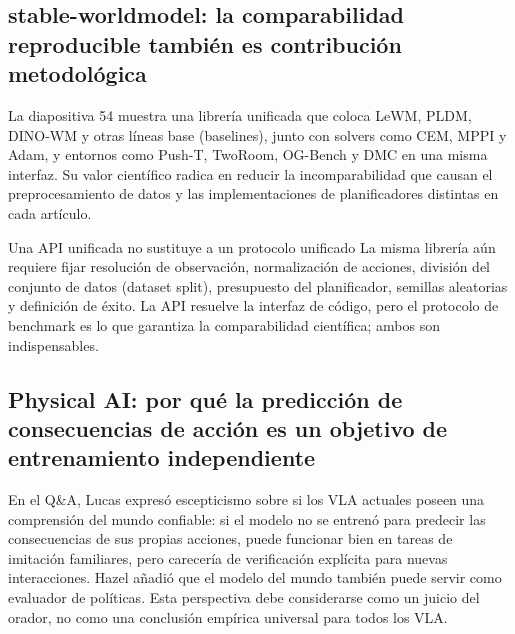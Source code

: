 
\subsection{stable-worldmodel: la comparabilidad reproducible también es contribución metodológica}

La diapositiva 54 muestra una librería unificada que coloca LeWM, PLDM, DINO-WM y otras líneas base (baselines), junto con solvers como CEM, MPPI y Adam, y entornos como Push-T, TwoRoom, OG-Bench y DMC en una misma interfaz. Su valor científico radica en reducir la incomparabilidad que causan el preprocesamiento de datos y las implementaciones de planificadores distintas en cada artículo.



\begin{importantbox}{Una API unificada no sustituye a un protocolo unificado}
La misma librería aún requiere fijar resolución de observación, normalización de acciones, división del conjunto de datos (dataset split), presupuesto del planificador, semillas aleatorias y definición de éxito. La API resuelve la interfaz de código, pero el protocolo de benchmark es lo que garantiza la comparabilidad científica; ambos son indispensables.
\end{importantbox}

\subsection{Physical AI: por qué la predicción de consecuencias de acción es un objetivo de entrenamiento independiente}

En el Q\&A, Lucas expresó escepticismo sobre si los VLA actuales poseen una comprensión del mundo confiable: si el modelo no se entrenó para predecir las consecuencias de sus propias acciones, puede funcionar bien en tareas de imitación familiares, pero carecería de verificación explícita para nuevas interacciones. Hazel añadió que el modelo del mundo también puede servir como evaluador de políticas. Esta perspectiva debe considerarse como un juicio del orador, no como una conclusión empírica universal para todos los VLA.

